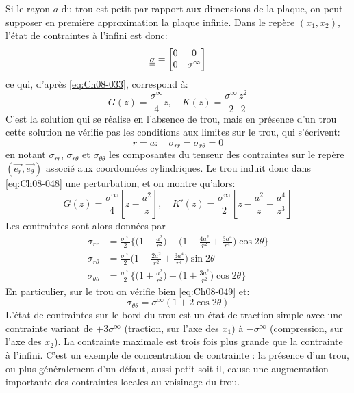 Si le rayon $a$ du trou est petit par rapport aux dimensions de la plaque, on peut supposer en première approximation la plaque infinie.
Dans le repère $(x_1,x_2)$, l'état de contraintes à l'infini est donc:
\begin{equation}
  \underline{\underline{\sigma}}=
    \begin{bmatrix}
      0 & 0 \\
      0 & \sigma^{\infty}
    \end{bmatrix}
    \label{eq:Ch08-047}
\end{equation}
ce qui, d'après \eqref{eq:Ch08-033}, correspond à: 
\begin{equation}
  G(z) = \frac{\sigma^{\infty}}{4} z, \quad K(z) = \frac{\sigma^{\infty}}{2}\frac{z^2}{2}
    \label{eq:Ch08-048}
\end{equation}
C'est la solution qui se réalise en l'absence de trou, mais en présence d'un trou cette solution ne vérifie pas les conditions aux limites sur le trou, qui s'écrivent: 
\begin{equation}
  r = a : \quad \sigma_{rr}=\sigma_{r\theta}=0
    \label{eq:Ch08-049}
\end{equation}
en notant $\sigma_{rr}$, $\sigma_{r\theta}$ et $\sigma_{\theta\theta}$ les composantes du tenseur des contraintes sur le repère $(\vec{e_r},\vec{e_{\theta}})$ associé aux coordonnées cylindriques. Le trou induit donc dans \eqref{eq:Ch08-048} une perturbation, et on montre qu'alors: 
\begin{equation}
  G(z) = \frac{\sigma^{\infty}}{4}\left[z-\frac{a^2}{z}\right], \quad K'(z)=\frac{\sigma^{\infty}}{2}\left[z-\frac{a^2}{z}-\frac{a^4}{z^3}\right]
    \label{eq:Ch08-050}
\end{equation}
Les contraintes sont alors données par 
\begin{equation}
  \begin{aligned}
    \sigma_{rr} & = \frac{\sigma^{\infty}}{2}\Biggl\{\Biggl(1-\frac{a^2}{r^2}\Biggr)-\Biggl(1-\frac{4a^2}{r^2}+\frac{3a^4}{r^4}\Biggr)\cos{2\theta}\Biggr\} \\
    \sigma_{r\theta} & = \frac{\sigma^{\infty}}{2} \Biggl(1-\frac{2a^2}{r^2}+\frac{3a^4}{r^4}\Biggr)\sin{2\theta}  \\
    \sigma_{\theta\theta} & = \frac{\sigma^{\infty}}{2}\Biggl\{\Biggl(1+\frac{a^2}{r^2}\Biggr)+\Biggl(1+\frac{3a^2}{r^2}\Biggr)\cos{2\theta}\Biggr\} 
  \end{aligned}
    \label{eq:Ch08-051}
\end{equation}
En particulier, sur le trou on vérifie bien \eqref{eq:Ch08-049} et:
\begin{equation}
  \sigma_{\theta\theta}=\sigma^{\infty}(1+2\cos{2\theta})
    \label{eq:Ch08-052}
\end{equation}
L'état de contraintes sur le bord du trou est un état de traction simple avec une contrainte variant de $+3\sigma^{\infty}$ (traction, sur l'axe des $x_1$) à $-\sigma^{\infty}$ (compression, sur l'axe des $x_2$). 
La contrainte maximale est trois fois plus grande que la contrainte à l'infini. 
C'est un exemple de concentration de contrainte : la présence d'un trou, ou plus généralement d'un défaut, aussi petit soit-il, cause une augmentation importante des contraintes locales au voisinage du trou. 

